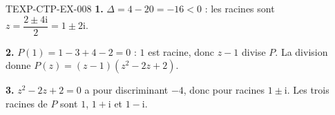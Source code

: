 \begin{corrige}{TEXP-CTP-EX-008}
\textbf{1.} $\Delta=4-20=-16<0$ : les racines sont
$z=\dfrac{2\pm4\mathrm{i}}{2}=1\pm2\mathrm{i}$.

\textbf{2.} $P(1)=1-3+4-2=0$ : $1$ est racine, donc $z-1$ divise $P$. La
division donne $P(z)=(z-1)(z^2-2z+2)$.

\textbf{3.} $z^2-2z+2=0$ a pour discriminant $-4$, donc pour racines
$1\pm\mathrm{i}$. Les trois racines de $P$ sont $1$, $1+\mathrm{i}$ et
$1-\mathrm{i}$.
\end{corrige}
